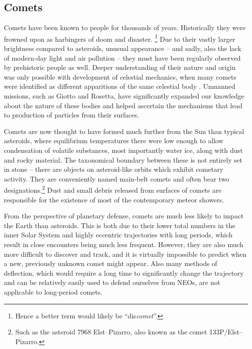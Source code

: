     \subsection{Comets} \label{iac}
        Comets have been known to people for thousands of years. Historically they were
        frowned upon as harbingers of doom and disaster.%
        \footnote{Hence a better term would likely be ``dis\textit{comet}''.}
        Due to their vastly larger brightness compared to asteroids, unusual appearance -- and sadly, also the
        lack of modern-day light and air pollution -- they must have been regularly observed by prehistoric people as well.
        Deeper understanding of their nature and origin was only possible with development of celestial mechanics,
        when many comets were identified as different apparitions of the same celestial body \citep{nasa-halley}.
        Unmanned missions, such as Giotto and Rosetta, have significantly expanded our knowledge
        about the nature of these bodies and helped ascertain the mechanisms that lead to production of particles from their surfaces.

        Comets are now thought to have formed much further from the Sun than typical asteroids,
        where equilibrium temperatures there were low enough to allow condensation of volatile substances,
        most importantly water ice, along with dust and rocky material.
        The taxonomical boundary between these is not entirely set in stone -- there
        are objects on asteroid-like orbits which exhibit cometary activity.
        They are conveniently named main-belt comets and often bear two
        designations.\footnote{Such as the asteroid 7968 Elst--Pizarro, also known as the comet 133P/Elst--Pizarro.}
        Dust and small debris released from surfaces of comets are responsible
        for the existence of most of the contemporary meteor showers.

        From the perspective of planetary defense, comets are much less likely to impact the Earth
        than asteroids. This is both due to their lower total numbers in the inner Solar System
        and highly eccentric trajectories with long periods, which result in close encounters being much less frequent.
        However, they are also much more difficult to discover and track, and it is virtually impossible
        to predict when a new, previously unknown comet might appear.
        Also many methods of deflection, which would require a long time to significantly change the trajectory and
        can be relatively easily used to defend ourselves from NEOs, are not applicable to long-period comets.

